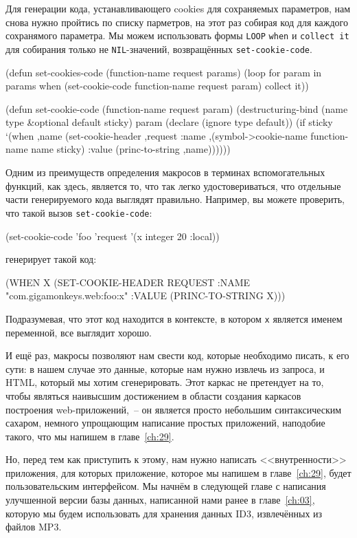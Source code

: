 Для генерации кода, устанавливающего cookies для сохраняемых параметров, нам снова нужно
пройтись по списку парметров, на этот раз собирая код для каждого сохранямого
параметра. Мы можем использовать формы \lstinline{LOOP} \lstinline{when} и \lstinline{collect it} для
собирания только не \lstinline{NIL}-значений, возвращённых \lstinline{set-cookie-code}.

\begin{myverb}
(defun set-cookies-code (function-name request params)
  (loop for param in params
       when (set-cookie-code function-name request param) collect it))

(defun set-cookie-code (function-name request param)
  (destructuring-bind (name type &optional default sticky) param
    (declare (ignore type default))
    (if sticky
      `(when ,name 
         (set-cookie-header 
          ,request
          :name ,(symbol->cookie-name function-name name sticky)
          :value (princ-to-string ,name))))))
\end{myverb}

Одним из преимуществ определения макросов в терминах вспомогательных функций, как здесь,
является то, что так легко удостовериваться, что отдельные части генерируемого кода
выглядят правильно. Например, вы можете проверить, что такой вызов \lstinline{set-cookie-code}:

\begin{myverb}
(set-cookie-code 'foo 'request '(x integer 20 :local))
\end{myverb}

\noindent{}генерирует такой код:

\begin{myverb}
  (WHEN X
    (SET-COOKIE-HEADER REQUEST
      :NAME "com.gigamonkeys.web:foo:x"
      :VALUE (PRINC-TO-STRING X)))
\end{myverb}

Подразумевая, что этот код находится в контексте, в котором \lstinline{x} является именем
переменной, все выглядит хорошо.

И ещё раз, макросы позволяют нам свести код, которые необходимо писать, к его сути: в
нашем случае это данные, которые нам нужно извлечь из запроса, и HTML, который мы хотим
сгенерировать. Этот каркас не претендует на то, чтобы являться наивысшим достижением в
области создания каркасов построения web-приложений,~-- он является просто небольшим
синтаксическим сахаром, немного упрощающим написание простых приложений, наподобие такого,
что мы напишем в главе~\ref{ch:29}.

Но, перед тем как приступить к этому, нам нужно написать <<внутренности>> приложения, для
которых приложение, которое мы напишем в главе~\ref{ch:29}, будет пользовательским
интерфейсом. Мы начнём в следующей главе с написания улучшенной версии базы данных,
написанной нами ранее в главе~\ref{ch:03}, которую мы будем использовать для хранения
данных ID3, извлечённых из файлов MP3.

